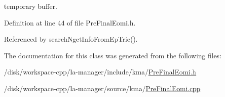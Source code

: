 temporary buffer. 



Definition at line 44 of file PreFinalEomi.h.

Referenced by searchNgetInfoFromEpTrie().

The documentation for this class was generated from the following files:\begin{CompactItemize}
\item 
/disk/workspace-cpp/la-manager/include/kma/\hyperlink{PreFinalEomi_8h}{PreFinalEomi.h}\item 
/disk/workspace-cpp/la-manager/source/kma/\hyperlink{PreFinalEomi_8cpp}{PreFinalEomi.cpp}\end{CompactItemize}
